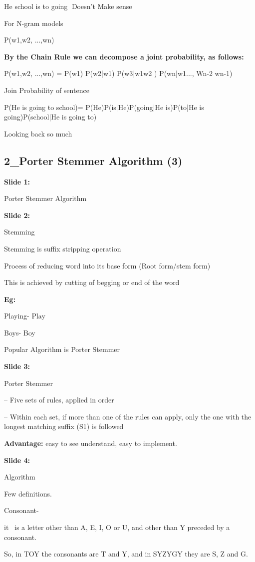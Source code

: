 \documentclass[11pt,a4paper]{article}
\begin{document}
He school is to going Doesn’t Make sense

For N-gram models

P(w1,w2, ...,wn)

\textbf{By the Chain Rule we can decompose a joint probability, as follows:} 

P(w1,w2, ...,wn) = P(w1) P(w2|w1) P(w3|w1w2 ) P(wn|w1..., Wn-2 wn-1)

Join Probability of sentence

P(He is going to school)= P(He)P(is|He)P(going|He is)P(to|He is going)P(school|He is going to)

Looking back so much


\subsection{2_Porter Stemmer Algorithm (3)}

\textbf{Slide 1:}

Porter Stemmer Algorithm

\textbf{Slide 2:}

Stemming

Stemming is suffix stripping operation

Process of reducing word into its base form (Root form/stem form)

This is achieved by cutting of begging or end of the word

\textbf{Eg:} 

Playing-    Play

Boys-         Boy

Popular Algorithm is Porter Stemmer

\textbf{Slide 3:}

Porter Stemmer

– Five sets of rules, applied in order

– Within each set, if more than one of the rules can apply, only the one with the longest matching suffix (S1) is followed

\textbf{Advantage:}   easy to see understand, easy to implement.

\textbf{Slide 4:}

Algorithm

Few definitions.

Consonant-

it  is a letter other than A, E, I, O or U, and other than Y preceded by a consonant.

So, in TOY the consonants are T and Y, and in SYZYGY they are S, Z and G.
\end{document}
